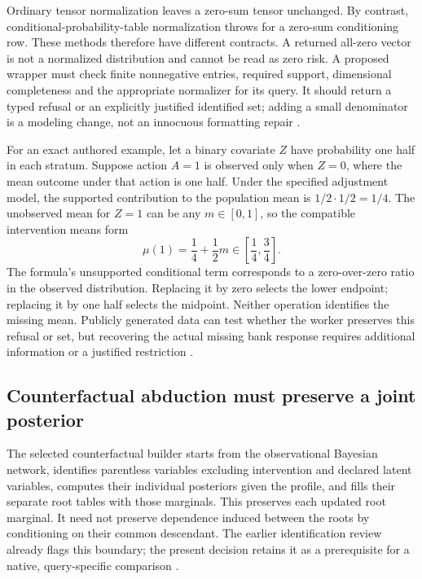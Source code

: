 Ordinary tensor normalization leaves a zero-sum tensor unchanged. By
contrast, conditional-probability-table normalization throws for a zero-sum
conditioning row. These methods therefore have different contracts.
A returned all-zero vector is not a normalized distribution and cannot be
read as zero risk. A proposed wrapper must check finite nonnegative entries,
required support, dimensional completeness and the appropriate normalizer
for its query. It should return a typed refusal or an explicitly justified
identified set; adding a small denominator is a modeling change, not an
innocuous formatting repair \cite{exec24_agrum_source,exec24_agrum_choice}.

For an exact authored example, let a binary covariate $Z$ have probability
one half in each stratum. Suppose action $A=1$ is observed only when $Z=0$,
where the mean outcome under that action is one half. Under the specified
adjustment model, the supported contribution to the population mean is
$1/2\cdot1/2=1/4$. The unobserved mean for $Z=1$ can be any $m\in[0,1]$,
so the compatible intervention means form
\[
 \mu(1)=\frac14+\frac12m\in\left[\frac14,\frac34\right].
\]
The formula's unsupported conditional term corresponds to a zero-over-zero
ratio in the observed distribution. Replacing it by zero selects the lower
endpoint; replacing it by one half selects the midpoint. Neither operation
identifies the missing mean. Publicly generated data can test whether the
worker preserves this refusal or set, but recovering the actual missing
bank response requires additional information or a justified restriction
\cite{exec24_agrum_choice}.

\subsection{Counterfactual abduction must preserve a joint posterior}
The selected counterfactual builder starts from the observational Bayesian
network, identifies parentless variables excluding intervention and declared
latent variables, computes their individual posteriors given the profile,
and fills their separate root tables with those marginals. This preserves
each updated root marginal. It need not preserve dependence induced between
the roots by conditioning on their common descendant. The earlier
identification review already flags this boundary; the present decision
retains it as a prerequisite for a native, query-specific comparison
\cite{exec19_cxx_identification_source,exec24_agrum_source}.

